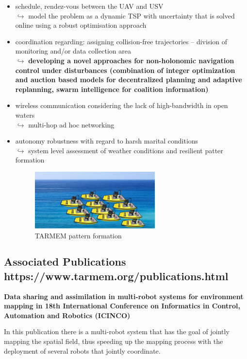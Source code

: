 \documentclass{article}
\begin{document}
\begin{itemize}
	\item schedule, rendez-vous between the UAV and USV \\
	$\hookrightarrow$ model the problem as a dynamic TSP with uncertainty that is solved online using a robust optimisation approach
	\item coordination regarding: assigning collision-free trajectories -- division of monitoring and/or data collection area \\
	$\hookrightarrow$ \textbf{developing a novel approaches for non-holonomic navigation control under disturbances (combination of integer optimization and auction based models for decentralized planning and adaptive replanning, swarm intelligence for coalition information)}
	\item wireless communication considering the lack of high-bandwidth in open waters \\
	$\hookrightarrow$ multi-hop ad hoc networking 
	\item autonomy robustness with regard to harsh marital conditions \\
	$\hookrightarrow$ system level assessment of weather conditions and resilient patter formation  
	
	\begin{figure}[htbp]
		\centerline{\includegraphics[scale=1]{tarmem-pattern-formation.png}}
		\caption{TARMEM pattern formation}
		\label{fig5}
	\end{figure}
	
\end{itemize} 

\subsection{Associated Publications https://www.tarmem.org/publications.html}

\textbf{Data sharing and assimilation in multi-robot systems for environment mapping in 18th International Conference on Informatics in Control, Automation and Robotics (ICINCO)}

In this publication there is a multi-robot system that has the goal of jointly mapping the spatial field, thus speeding up the mapping process with the deployment of several robots that jointly coordinate.  
\end{document}
